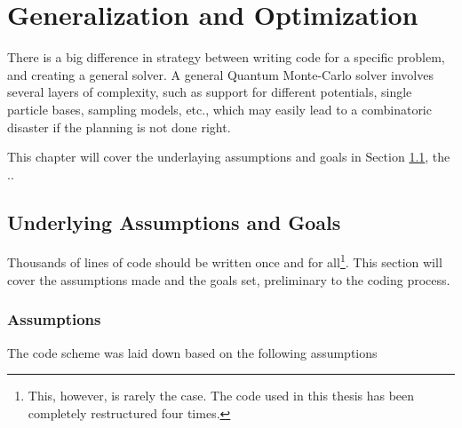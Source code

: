 \chapter{Generalization and Optimization}

There is a big difference in strategy between writing code for a specific problem, and creating a general solver. A general Quantum Monte-Carlo solver involves several layers of complexity, such as support for different potentials, single particle bases, sampling models, etc., which may easily lead to a combinatoric disaster if the planning is not done right. 

This chapter will cover the underlaying assumptions and goals in Section \ref{sec:AssGoal}, the ..

\section{Underlying Assumptions and Goals}
\label{sec:AssGoal}

Thousands of lines of code should be written once and for all\footnote{This, however, is rarely the case. The code used in this thesis has been completely restructured four times.}. This section will cover the assumptions made and the goals set, preliminary to the coding process.

\subsection{Assumptions}
\label{sec:ass}

The code scheme was laid down based on the following assumptions


